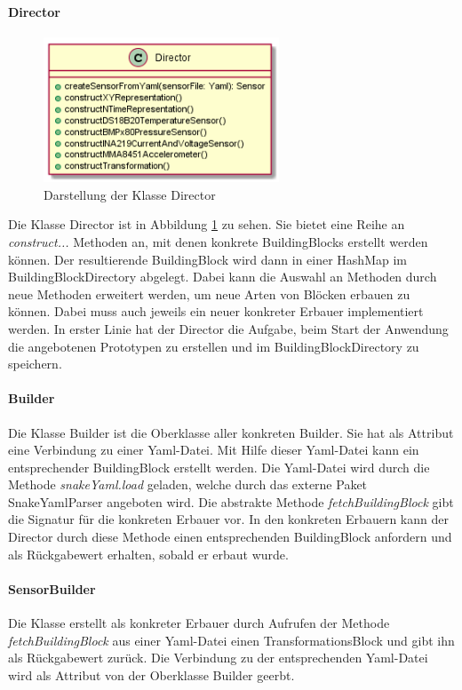 \documentclass[parskip=full]{scrartcl}
\begin{document}
\paragraph{Director}
\begin{figure}[htbp]
	\begin{center}
		\includegraphics[width = 7cm]{Grafiken/Director.png}
		\caption{Darstellung der Klasse Director}
		\label{Director}
	\end{center}
\end{figure}
Die Klasse Director ist in Abbildung \ref{Director} zu sehen. Sie bietet eine Reihe an \textit{construct...} Methoden an, mit denen konkrete BuildingBlocks erstellt werden können. Der resultierende BuildingBlock wird dann in einer HashMap im BuildingBlockDirectory abgelegt. Dabei kann die Auswahl an Methoden durch neue Methoden erweitert werden, um neue Arten von Blöcken erbauen zu können. Dabei muss auch jeweils ein neuer konkreter Erbauer implementiert werden. In erster Linie hat der Director die Aufgabe, beim Start der Anwendung die angebotenen Prototypen zu erstellen und im BuildingBlockDirectory zu speichern. 

\paragraph{Builder}
Die Klasse Builder ist die Oberklasse aller konkreten Builder. Sie hat als Attribut eine Verbindung zu einer Yaml-Datei. Mit Hilfe dieser Yaml-Datei kann ein entsprechender BuildingBlock erstellt werden. Die Yaml-Datei wird durch die Methode \textit{snakeYaml.load} geladen, welche durch das externe Paket SnakeYamlParser angeboten wird. Die abstrakte Methode \textit{fetchBuildingBlock} gibt die Signatur für die konkreten Erbauer vor. In den konkreten Erbauern kann der Director durch diese Methode einen entsprechenden BuildingBlock anfordern und als Rückgabewert erhalten, sobald er erbaut wurde. 

\paragraph{SensorBuilder}
Die Klasse erstellt als konkreter Erbauer durch Aufrufen der Methode \textit{fetchBuildingBlock} aus einer Yaml-Datei einen TransformationsBlock und gibt ihn als Rückgabewert zurück. Die Verbindung zu der entsprechenden Yaml-Datei wird als Attribut von der Oberklasse Builder geerbt.
\end{document}
